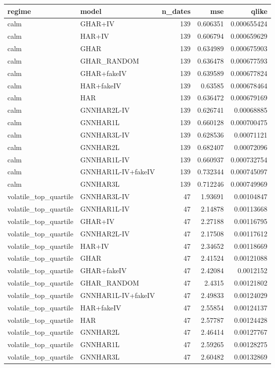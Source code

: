 \begin{tabular}{llrrr}
\toprule
regime & model & n_dates & mse & qlike \\
\midrule
calm & GHAR+IV & 139 & 0.606351 & 0.000655424 \\
calm & HAR+IV & 139 & 0.606794 & 0.000659629 \\
calm & GHAR & 139 & 0.634989 & 0.000675903 \\
calm & GHAR_RANDOM & 139 & 0.636478 & 0.000677593 \\
calm & GHAR+fakeIV & 139 & 0.639589 & 0.000677824 \\
calm & HAR+fakeIV & 139 & 0.63585 & 0.000678464 \\
calm & HAR & 139 & 0.636472 & 0.000679169 \\
calm & GNNHAR2L-IV & 139 & 0.626741 & 0.00068885 \\
calm & GNNHAR1L & 139 & 0.660128 & 0.000700475 \\
calm & GNNHAR3L-IV & 139 & 0.628536 & 0.00071121 \\
calm & GNNHAR2L & 139 & 0.682407 & 0.00072096 \\
calm & GNNHAR1L-IV & 139 & 0.660937 & 0.000732754 \\
calm & GNNHAR1L-IV+fakeIV & 139 & 0.732344 & 0.000745097 \\
calm & GNNHAR3L & 139 & 0.712246 & 0.000749969 \\
volatile_top_quartile & GNNHAR3L-IV & 47 & 1.93691 & 0.00104847 \\
volatile_top_quartile & GNNHAR1L-IV & 47 & 2.14878 & 0.00113668 \\
volatile_top_quartile & GHAR+IV & 47 & 2.27188 & 0.00116795 \\
volatile_top_quartile & GNNHAR2L-IV & 47 & 2.17508 & 0.00117612 \\
volatile_top_quartile & HAR+IV & 47 & 2.34652 & 0.00118669 \\
volatile_top_quartile & GHAR & 47 & 2.41524 & 0.00121088 \\
volatile_top_quartile & GHAR+fakeIV & 47 & 2.42084 & 0.0012152 \\
volatile_top_quartile & GHAR_RANDOM & 47 & 2.4315 & 0.00121802 \\
volatile_top_quartile & GNNHAR1L-IV+fakeIV & 47 & 2.49833 & 0.00124029 \\
volatile_top_quartile & HAR+fakeIV & 47 & 2.55854 & 0.00124137 \\
volatile_top_quartile & HAR & 47 & 2.57787 & 0.00124428 \\
volatile_top_quartile & GNNHAR2L & 47 & 2.46414 & 0.00127767 \\
volatile_top_quartile & GNNHAR1L & 47 & 2.59265 & 0.00128275 \\
volatile_top_quartile & GNNHAR3L & 47 & 2.60482 & 0.00132869 \\
\bottomrule
\end{tabular}

